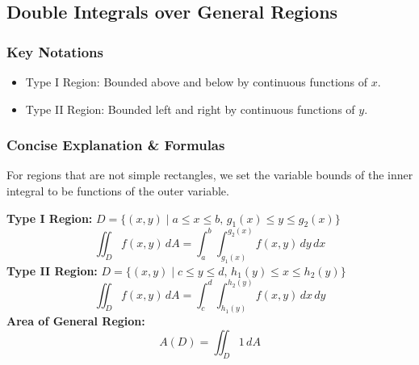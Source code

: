 \documentclass[11pt]{article}
\begin{document}
\subsection{Double Integrals over General Regions}
\subsubsection*{Key Notations}
\begin{itemize}
    \item Type I Region: Bounded above and below by continuous functions of $x$.
    \item Type II Region: Bounded left and right by continuous functions of $y$.
\end{itemize}

\subsubsection*{Concise Explanation \& Formulas}
For regions that are not simple rectangles, we set the variable bounds of the inner integral to be functions of the outer variable.
\begin{formulabox}
    \textbf{Type I Region:} $D = \{(x,y) \mid a \le x \le b, \, g_1(x) \le y \le g_2(x)\}$
    \[ \iint_D f(x,y)\,dA = \int_a^b \int_{g_1(x)}^{g_2(x)} f(x,y)\,dy\,dx \]
    \textbf{Type II Region:} $D = \{(x,y) \mid c \le y \le d, \, h_1(y) \le x \le h_2(y)\}$
    \[ \iint_D f(x,y)\,dA = \int_c^d \int_{h_1(y)}^{h_2(y)} f(x,y)\,dx\,dy \]
    \textbf{Area of General Region:}
    \[ A(D) = \iint_D 1\,dA \]
\end{formulabox}
\end{document}
